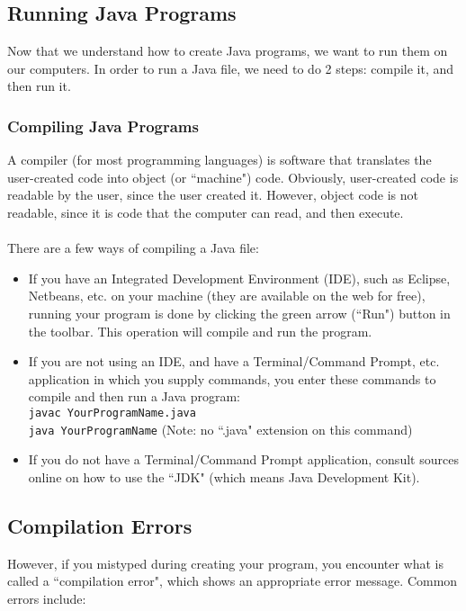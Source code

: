 \subsection{Running Java Programs}
Now that we understand how to create Java programs, we want to run them on our computers. In order to run a Java file, we need to do 2 steps: compile it, and then run it.

\subsubsection{Compiling Java Programs}
A compiler (for most programming languages) is software that translates the user-created code into object (or ``machine") code. Obviously, user-created code is readable by the user, since the user created it. However, object code is not readable, since it is code that the computer can read, and then execute.
\\ \\
There are a few ways of compiling a Java file:
\begin{itemize}
\item If you have an Integrated Development Environment (IDE), such as Eclipse, Netbeans, etc. on your machine (they are available on the web for free), running your program is done by clicking the green arrow (``Run") button in the toolbar. This operation will compile and run the program.

\item If you are not using an IDE, and have a Terminal/Command Prompt, etc. application in which you supply commands, you enter these commands to compile and then run a Java program:
\\
\verb|javac YourProgramName.java| \\
\verb|java YourProgramName| (Note: no ``.java" extension on this command)

\item If you do not have a Terminal/Command Prompt application, consult sources online on how to use the ``JDK" (which means Java Development Kit).
\end{itemize}

\subsection{Compilation Errors}
However, if you mistyped during creating your program, you encounter what is called a ``compilation error", which shows an appropriate error message. Common errors include:

